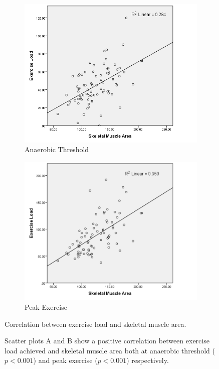 \begin{figure}[htb]
	\centering
	\begin{subfigure}[b]{0.45\textwidth}
		\centering
		\includegraphics[width=\textwidth]{Figures/bc_scatter_atLoad_skeletal}
		\caption{Anaerobic Threshold}
		\label{fig:bc_at_load_vs_sm}
	\end{subfigure}
	\hfill
	\begin{subfigure}[b]{0.45\textwidth}
		\centering
		\includegraphics[width=\textwidth]{Figures/bc_scatter_pkLoad_skeletal}
		\caption{Peak Exercise}
		\label{fig:bc_pk_load_vs_sm}
	\end{subfigure}
	\caption{Correlation between exercise load and skeletal muscle area.}
	\caption*{Scatter plots A and B show a positive correlation between exercise load achieved and skeletal muscle area both at anaerobic threshold ($p < 0.001$) and peak exercise ($p < 0.001$) respectively.}	
	\label{fig:bc_load_vs_sm}
	
\end{figure}


